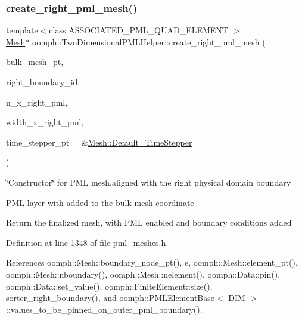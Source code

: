 \mbox{\label{namespaceoomph_1_1TwoDimensionalPMLHelper_aefa58c9106ac3bee876a0bff81ab1a64}} 
\subsubsection{\texorpdfstring{create\+\_\+right\+\_\+pml\+\_\+mesh()}{create\_right\_pml\_mesh()}}
{\footnotesize\ttfamily template$<$class A\+S\+S\+O\+C\+I\+A\+T\+E\+D\+\_\+\+P\+M\+L\+\_\+\+Q\+U\+A\+D\+\_\+\+E\+L\+E\+M\+E\+NT $>$ \\
\hyperlink{classoomph_1_1Mesh}{Mesh}$\ast$ oomph\+::\+Two\+Dimensional\+P\+M\+L\+Helper\+::create\+\_\+right\+\_\+pml\+\_\+mesh (\begin{DoxyParamCaption}\item[{\hyperlink{classoomph_1_1Mesh}{Mesh} $\ast$}]{bulk\+\_\+mesh\+\_\+pt,  }\item[{const unsigned \&}]{right\+\_\+boundary\+\_\+id,  }\item[{const unsigned \&}]{n\+\_\+x\+\_\+right\+\_\+pml,  }\item[{const double \&}]{width\+\_\+x\+\_\+right\+\_\+pml,  }\item[{\hyperlink{classoomph_1_1TimeStepper}{Time\+Stepper} $\ast$}]{time\+\_\+stepper\+\_\+pt = {\ttfamily \&\hyperlink{classoomph_1_1Mesh_a12243d0fee2b1fcee729ee5a4777ea10}{Mesh\+::\+Default\+\_\+\+Time\+Stepper}} }\end{DoxyParamCaption})}



\char`\"{}\+Constructor\char`\"{} for P\+ML mesh,aligned with the right physical domain boundary 

P\+ML layer with added to the bulk mesh coordinate

Return the finalized mesh, with P\+ML enabled and boundary conditions added 

Definition at line 1348 of file pml\+\_\+meshes.\+h.



References oomph\+::\+Mesh\+::boundary\+\_\+node\+\_\+pt(), e, oomph\+::\+Mesh\+::element\+\_\+pt(), oomph\+::\+Mesh\+::nboundary(), oomph\+::\+Mesh\+::nelement(), oomph\+::\+Data\+::pin(), oomph\+::\+Data\+::set\+\_\+value(), oomph\+::\+Finite\+Element\+::size(), sorter\+\_\+right\+\_\+boundary(), and oomph\+::\+P\+M\+L\+Element\+Base$<$ D\+I\+M $>$\+::values\+\_\+to\+\_\+be\+\_\+pinned\+\_\+on\+\_\+outer\+\_\+pml\+\_\+boundary().

